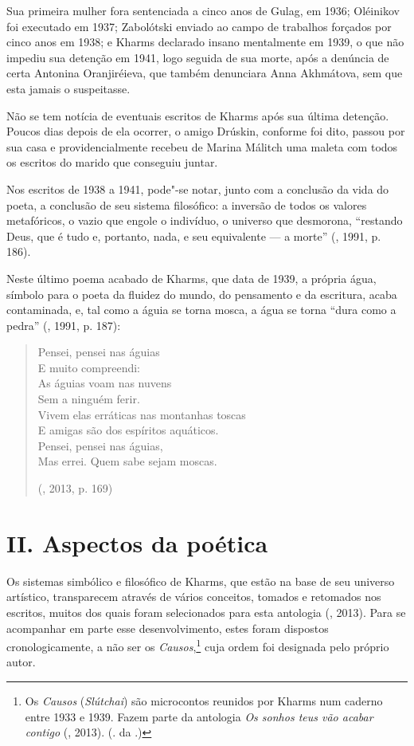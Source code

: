 Sua primeira mulher fora sentenciada a cinco anos de Gulag,
em 1936; Oléinikov foi executado em 1937; Zabolótski enviado ao
campo de trabalhos forçados por cinco anos em 1938; e Kharms
declarado insano mentalmente em 1939, o que não impediu sua
detenção em 1941, logo seguida de sua morte, após a denúncia
de certa Antonina Oranjiréieva, que também denunciara Anna
Akhmátova, sem que esta jamais o suspeitasse.

Não se tem notícia de eventuais escritos de Kharms após sua
última detenção. Poucos dias depois de ela ocorrer, o amigo
Drúskin, conforme foi dito, passou por sua casa e
providencialmente recebeu de Marina Málitch uma maleta com
todos os escritos do marido que conseguiu juntar.

Nos escritos de 1938 a 1941, pode"-se notar, junto com a conclusão
da vida do poeta, a conclusão de seu sistema filosófico: a inversão
de todos os valores metafóricos, o vazio que engole o indivíduo, o
universo que desmorona, ``restando Deus, que é tudo e, portanto,
nada, e seu equivalente --- a morte'' (, 1991, p. 186).

Neste último poema acabado de Kharms, que data de 1939, a própria
água, símbolo para o poeta da fluidez do mundo, do pensamento e da
escritura, acaba contaminada, e, tal como a águia se torna mosca,
a água se torna ``dura como a pedra'' (, 1991, p.
187): 

\begin{verse}
Pensei, pensei nas águias \\
E muito compreendi: \\
As águias voam nas nuvens \\
Sem a ninguém ferir. \\
Vivem elas erráticas nas montanhas toscas \\
E amigas são dos espíritos aquáticos. \\
Pensei, pensei nas águias, \\
Mas errei. Quem sabe sejam moscas.

(, 2013, p. 169)

\end{verse}

\section{\uppercase{II}. \uppercase{A}spectos da poética}

Os sistemas simbólico e filosófico de Kharms, que estão na base de seu
universo artístico, transparecem através de
vários conceitos, tomados e retomados nos escritos, muitos dos quais foram selecionados
 para esta antologia (, 2013). Para se acompanhar em
 parte esse desenvolvimento, estes foram dispostos cronologicamente,
 a não ser os \emph{Causos},\footnote{Os \emph{Causos} (\emph{Slútchai}) são microcontos reunidos por Kharms num caderno entre 1933 e 1939. Fazem parte da antologia \emph{Os sonhos teus vão acabar contigo} (, 2013). (. da .)} cuja ordem foi designada pelo próprio
 autor.


